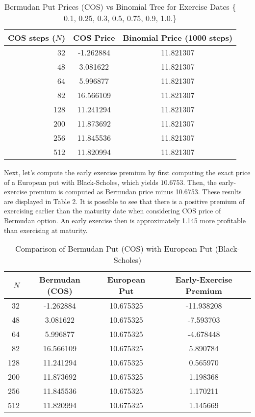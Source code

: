 \documentclass{article}
\begin{document}
\begin{table}[h!]
\centering
\begin{tabular}{@{}rcc@{}}
\toprule
COS steps ($N$) & COS Price & Binomial Price (1000 steps) \\
\midrule
32  &  -1.262884  & 11.821307 \\
48  &   3.081622  & 11.821307 \\
64  &   5.996877  & 11.821307 \\
82  &  16.566109  & 11.821307 \\
128 &  11.241294  & 11.821307 \\
200 &  11.873692  & 11.821307 \\
256 &  11.845536  & 11.821307 \\
512 &  11.820994  & 11.821307 \\
\bottomrule
\end{tabular}
\caption{Bermudan Put Prices (COS) vs Binomial Tree for Exercise Dates \{ 0.1, 0.25, 0.3, 0.5, 0.75, 0.9, 1.0.\}}
\end{table}
 Next, let's compute the early exercise premium by first computing the exact price of a European put with Black-Scholes, which yields $ \mathbf{10.6753}$. Then, the early-exercise premium is computed as Bermudan price minus 10.6753. These results are displayed in Table 2. It is possible to see that there is a positive premium of exercising earlier than the maturity date when considering COS price of Bermudan option. An early exercise then is approximately 1.145 more profitable than exercising at maturity.

\begin{table}[h!]
\centering
\begin{tabular}{@{}rccc@{}}
\toprule
$N$ & Bermudan (COS) & European Put & Early-Exercise Premium \\
\midrule
32  & -1.262884  & 10.675325 & -11.938208 \\
48  &  3.081622  & 10.675325 &  -7.593703 \\
64  &  5.996877  & 10.675325 &  -4.678448 \\
82  & 16.566109  & 10.675325 &   5.890784 \\
128 & 11.241294  & 10.675325 &   0.565970 \\
200 & 11.873692  & 10.675325 &   1.198368 \\
256 & 11.845536  & 10.675325 &   1.170211 \\
512 & 11.820994  & 10.675325 &   1.145669 \\
\bottomrule
\end{tabular}
\caption{Comparison of Bermudan Put (COS) with European Put (Black-Scholes)}
\end{table}
\end{document}
